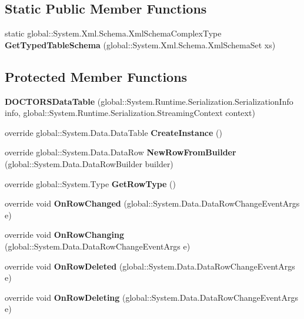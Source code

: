 \subsection*{Static Public Member Functions}
\begin{CompactItemize}
\item 
static global::System.Xml.Schema.XmlSchemaComplexType \textbf{GetTypedTableSchema} (global::System.Xml.Schema.XmlSchemaSet xs)\label{class_automatic_medical_system_1_1_data_set2_1_1_d_o_c_t_o_r_s_data_table_fc136dff9dc8a25bbdadee8f8adec800}

\end{CompactItemize}
\subsection*{Protected Member Functions}
\begin{CompactItemize}
\item 
\textbf{DOCTORSDataTable} (global::System.Runtime.Serialization.SerializationInfo info, global::System.Runtime.Serialization.StreamingContext context)\label{class_automatic_medical_system_1_1_data_set2_1_1_d_o_c_t_o_r_s_data_table_a74e1e42f630d3d7f436f76f611c021e}

\item 
override global::System.Data.DataTable \textbf{CreateInstance} ()\label{class_automatic_medical_system_1_1_data_set2_1_1_d_o_c_t_o_r_s_data_table_d71df046e00df849036a86aeecd90d97}

\item 
override global::System.Data.DataRow \textbf{NewRowFromBuilder} (global::System.Data.DataRowBuilder builder)\label{class_automatic_medical_system_1_1_data_set2_1_1_d_o_c_t_o_r_s_data_table_48a265ff5964841eb72d279ecc14cab3}

\item 
override global::System.Type \textbf{GetRowType} ()\label{class_automatic_medical_system_1_1_data_set2_1_1_d_o_c_t_o_r_s_data_table_39e4e811e2605f925ed8cd8b2acdfa21}

\item 
override void \textbf{OnRowChanged} (global::System.Data.DataRowChangeEventArgs e)\label{class_automatic_medical_system_1_1_data_set2_1_1_d_o_c_t_o_r_s_data_table_cd8b0af5134e533f4e9828fdd273f581}

\item 
override void \textbf{OnRowChanging} (global::System.Data.DataRowChangeEventArgs e)\label{class_automatic_medical_system_1_1_data_set2_1_1_d_o_c_t_o_r_s_data_table_02a09ea25f35148bf0d0138fd430cd5b}

\item 
override void \textbf{OnRowDeleted} (global::System.Data.DataRowChangeEventArgs e)\label{class_automatic_medical_system_1_1_data_set2_1_1_d_o_c_t_o_r_s_data_table_cf9c26f0047d07f33a2202f4e678cd19}

\item 
override void \textbf{OnRowDeleting} (global::System.Data.DataRowChangeEventArgs e)\label{class_automatic_medical_system_1_1_data_set2_1_1_d_o_c_t_o_r_s_data_table_11660febcff8f27faccf3444fd6aac62}

\end{CompactItemize}
